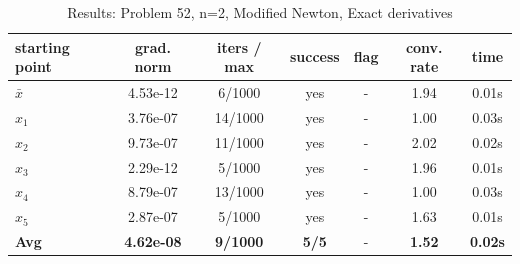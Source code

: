 \begin{longtable}{|l|c|c|c|c|c|c|}
\caption{Results: Problem 52, n=2, Modified Newton, Exact derivatives} \\
\hline
\textbf{starting point} & \textbf{grad. norm} & \textbf{iters / max} & \textbf{success} & \textbf{flag} & \textbf{conv. rate} & \textbf{time} \\
\hline
\endfirsthead
\endhead
\endfoot
\hline
\endlastfoot
$\bar{x}$ & 4.53e-12 & 6/1000 & yes & - & 1.94 & 0.01s \\
\hline
$x_1$ & 3.76e-07 & 14/1000 & yes & - & 1.00 & 0.03s \\
\hline
$x_2$ & 9.73e-07 & 11/1000 & yes & - & 2.02 & 0.02s \\
\hline
$x_3$ & 2.29e-12 & 5/1000 & yes & - & 1.96 & 0.01s \\
\hline
$x_4$ & 8.79e-07 & 13/1000 & yes & - & 1.00 & 0.03s \\
\hline
$x_5$ & 2.87e-07 & 5/1000 & yes & - & 1.63 & 0.01s \\
\hline
\hline\hline
\textbf{Avg} & \textbf{4.62e-08} & \textbf{9/1000} & \textbf{5/5} & - & \textbf{1.52} & \textbf{0.02s} \\
\hline\hline
\end{longtable}


